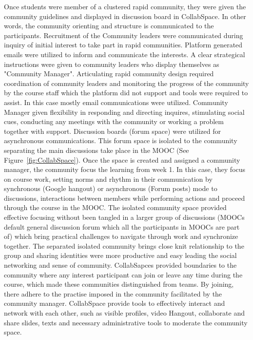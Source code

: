\documentclass[manuscript,screen,review]{acmart}
\begin{document}
Once students were member of a clustered rapid community, they were given the community guidelines and displayed in discussion board in CollabSpace. In other words, the community orienting and structure is communicated to the participants. Recruitment of the Community leaders were communicated during inquiry of initial interest to take part in rapid communities. Platform generated emails were utilized to inform and communicate the interests. A clear strategical instructions were given to community leaders who display themselves as "Community Manager". Articulating rapid community design required coordination of community leaders and monitoring the progress of the community by the course staff which the platform did not support and tools were required to assist. In this case mostly email communications were utilized. Community Manager given flexibility in responding and directing inquires, stimulating social cues, conducting any meetings with the community or working a problem together with support. Discussion boards (forum space) were utilized for asynchronous communications. This forum space is isolated to the community separating the main discussions take place in the MOOC (See Figure~\ref{fig:CollabSpace}). Once the space is created and assigned a community manager, the community focus the learning from week 1. In this case, they focus on course work, setting norms and rhythm in their communication by synchronous (Google hangout) or asynchronous (Forum posts) mode to discussions, interactions between members while performing actions and proceed through the course in the MOOC. The isolated community space provided effective focusing without been tangled in a larger group of discussions (MOOCs default general discussion forum which all the participants in MOOCs are part of) which bring practical challenges to navigate through work and synchronize together. The separated isolated community brings close knit relationship to the group and sharing identities were more productive and easy leading the social networking and sense of community. CollabSapces provided boundaries to the community where any interest participant can join or leave any time during the course, which made these communities distinguished from teams. By joining, there adhere to the practise imposed in the community facilitated by the community manager. CollabSpace provide tools to effectively interact and network with each other, such as visible profiles, video Hangout, collaborate and share slides, texts and necessary administrative tools to moderate the community space. 
\end{document}
